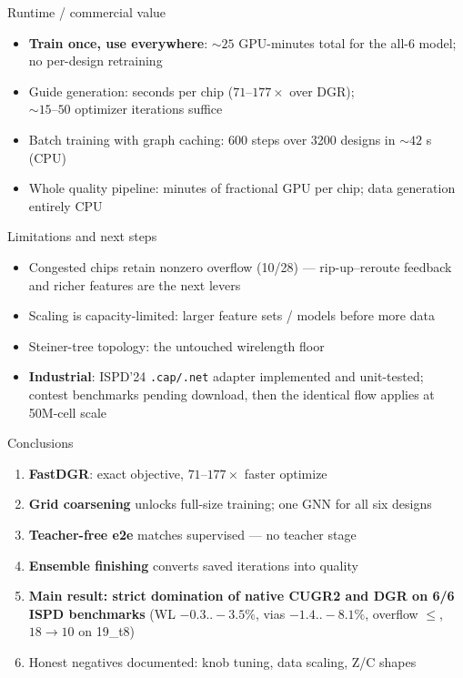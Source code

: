 \documentclass[10pt]{beamer}
\begin{document}
\begin{frame}{Runtime / commercial value}
\begin{itemize}
\item \textbf{Train once, use everywhere}: ${\sim}25$ GPU-minutes total for
      the all-6 model; no per-design retraining
\item Guide generation: seconds per chip ($71$--$177\times$ over DGR);
      \\ ${\sim}15$--$50$ optimizer iterations suffice
\item Batch training with graph caching: 600 steps over 3200 designs in
      ${\sim}42$ s (CPU)
\item Whole quality pipeline: minutes of fractional GPU per chip;
      data generation entirely CPU
\end{itemize}
\end{frame}

\begin{frame}{Limitations and next steps}
\begin{itemize}
\item Congested chips retain nonzero overflow (10/28) --- rip-up--reroute
      feedback and richer features are the next levers
\item Scaling is capacity-limited: larger feature sets / models before more
      data
\item Steiner-tree topology: the untouched wirelength floor
\item \textbf{Industrial}: ISPD'24 \texttt{.cap/.net} adapter implemented and
      unit-tested; contest benchmarks pending download, then the identical
      flow applies at 50M-cell scale
\end{itemize}
\end{frame}

\begin{frame}{Conclusions}
\begin{enumerate}
\item \textbf{FastDGR}: exact objective, $71$--$177\times$ faster optimize
\item \textbf{Grid coarsening} unlocks full-size training; one GNN for all
      six designs
\item \textbf{Teacher-free e2e} matches supervised --- no teacher stage
\item \textbf{Ensemble finishing} converts saved iterations into quality
\item \textbf{Main result: strict domination of native CUGR2 and DGR on
      6/6 ISPD benchmarks} (WL $-0.3..-3.5\%$, vias $-1.4..-8.1\%$,
      overflow $\le$, $18\to10$ on 19\_t8)
\item Honest negatives documented: knob tuning, data scaling, Z/C shapes
\end{enumerate}
\end{frame}
\end{document}
